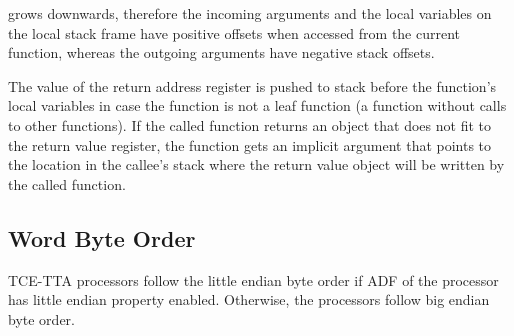 \documentclass[twoside]{tceusermanual}
\begin{document}


grows downwards, therefore the incoming arguments and the local variables on
the local stack frame have positive offsets when accessed from the current
function, whereas the outgoing arguments have negative stack offsets.


The value of the return address register is pushed to stack before the 
function's local variables in case the function is not a leaf function
(a function without calls to other functions). If the called function returns 
an object that does not fit to the return value register, the function 
gets an implicit argument that points to the location in the callee's 
stack where the return value object will be written by the called function. 

\subsection{Word Byte Order}
\label{ssec:word-order}

TCE-TTA processors follow the little endian byte order if ADF of the
processor has little endian property enabled. Otherwise, the processors
follow big endian byte order.
\end{document}
